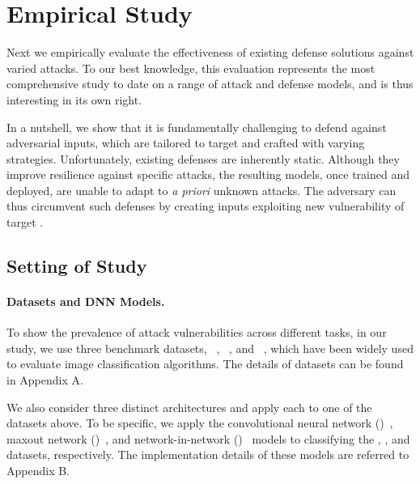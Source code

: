 \section{Empirical Study}
\label{sec:measure}


Next we empirically evaluate the effectiveness of existing defense solutions against varied attacks. To our best knowledge, this evaluation represents the most comprehensive study to date on a range of attack and defense models, and is thus interesting in its own right.




In a nutshell, we show that it is fundamentally challenging to defend against adversarial inputs, which are tailored to target \dnns and crafted with varying strategies.
Unfortunately, existing defenses are inherently static. Although they improve \dnn resilience against specific attacks, the resulting models, once trained and deployed, are unable to adapt to {\em a priori} unknown attacks. The adversary can thus circumvent such defenses by creating inputs exploiting new vulnerability of target \dnns.




\subsection{Setting of Study}


\paragraph*{Datasets and DNN Models.\;}
To show the prevalence of attack vulnerabilities across different tasks, in our study, we use three benchmark datasets, \mnist~\cite{mnist},  \cifar~\cite{cifar}, and \svhn~\cite{svhn}, which have been widely used to evaluate image classification algorithms. The details of datasets can be found in Appendix A.

We also consider three distinct \dnn architectures and apply each to one of the datasets above. To be specific, we apply the convolutional neural network (\cnn)~\cite{LeCun:1998:cnn}, maxout network (\mxn)~\cite{lin:2014:iclr}, and network-in-network (\nin)~\cite{lin:2014:iclr} models to classifying the \mnist, \cifar, and \svhn datasets, respectively. The implementation details of these \dnn models are referred to Appendix B.



